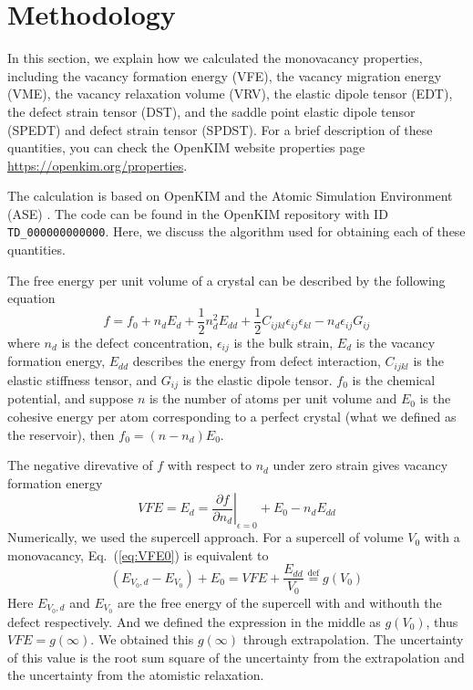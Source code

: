\documentclass[%
 reprint,
 amsmath,amssymb,
 aps,
]{revtex4-1}
\begin{document}
\section{\label{sec:method}Methodology}

In this section, we explain how we calculated the monovacancy properties, including the vacancy formation energy (VFE), the vacancy migration energy (VME), the vacancy relaxation volume (VRV), the elastic dipole tensor (EDT), the defect strain tensor (DST), and the saddle point elastic dipole tensor (SPEDT) and defect strain tensor (SPDST).
For a brief description of these quantities, you can check the OpenKIM website properties page \url{https://openkim.org/properties}.

The calculation is based on OpenKIM \cite{openkim2016} and the Atomic Simulation Environment (ASE) \cite{bahn2002object}.
The code can be found in the OpenKIM repository with ID \lstinline{TD_000000000000}.
Here, we discuss the algorithm used for obtaining each of these quantities.

The free energy per unit volume of a crystal can be described by the following equation \cite{freedman2009elastic}
\begin{equation}\label{eq:f}
f = f_0 + n_dE_d + \frac{1}{2}n_d^2E_{dd} + \frac{1}{2}C_{ijkl}\epsilon_{ij}\epsilon_{kl} - n_d\epsilon_{ij}G_{ij}
\end{equation}
where $n_d$ is the defect concentration, $\epsilon_{ij}$ is the bulk strain, $E_d$ is the vacancy formation energy, $E_{dd}$ describes the energy from defect interaction, $C_{ijkl}$ is the elastic stiffness tensor, and $G_{ij}$ is the elastic dipole tensor.
$f_0$ is the chemical potential, and suppose $n$ is the number of atoms per unit volume and $E_0$ is the cohesive energy per atom corresponding to a perfect crystal (what we defined as the reservoir), then $f_0 = (n - n_d) E_{0}$.

The negative direvative of $f$ with respect to $n_d$ under zero strain gives vacancy formation energy
\begin{equation}
  \label{eq:VFE0}
  \mathit{VFE} = E_d = \left.\frac{\partial f}{\partial n_d}\right|_{\epsilon = 0} + E_{0} - n_d E_{dd}
\end{equation}
Numerically, we used the supercell approach.
For a supercell of volume $V_0$ with a monovacancy, Eq.~(\ref{eq:VFE0}) is equivalent to
\begin{equation}
  (E_{V_0, d} - E_{V_0}) + E_{0} = \mathit{VFE} + \frac{E_{dd}}{V_0} \stackrel{\mathrm{def}}{=} \mathit{g}(V_0)
\end{equation}
Here $E_{V_0, d}$ and $E_{V_0}$ are the free energy of the supercell with and withouth the defect respectively.
And we defined the expression in the middle as $g(V_0)$, thus $\mathit{VFE} = g(\infty)$.
We obtained this $g(\infty)$ through extrapolation.
The uncertainty of this value is the root sum square of the uncertainty from the extrapolation and the uncertainty from the atomistic relaxation.
\end{document}
